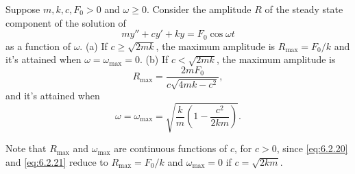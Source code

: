 \begin{theorem}
  \color{blue}
  \label{thmtype:6.2.1} Suppose $m,k,c,F_{0}>0$ and $\omega\ge0$. Consider the amplitude $R$ of the steady state component of the
  solution of
  \[
    my''+cy'+ky=F_{0}\cos\omega t
  \]
  as a function of $\omega$.
  \newline
  \indent
  {\rm(a)} If $c\ge\sqrt{2mk}$, the maximum amplitude is $R_{\max}=F_{0}/k$ and it's attained when
  $\omega= \omega_{\max}=0$.
  \newline
  \indent
  {\rm(b)} If $c<\sqrt{2mk}$, the maximum amplitude is
  \begin{equation}
    \label{eq:6.2.20}R_{\max}=\frac{2mF_{0}}{c\sqrt{4mk-c^{2}}},
  \end{equation}
  and it's attained when
  \begin{equation}
    \label{eq:6.2.21}\omega=\omega_{\max}=\sqrt{\frac{k}{m}\left(1-\frac{c^{2}}{2km}\right)}.
  \end{equation}
\end{theorem}
Note that $R_{\max}$ and $\omega_{\max}$ are continuous functions of $c$, for $c>0$, since
\eqref{eq:6.2.20} and \eqref{eq:6.2.21} reduce to $R_{\max}=F_{0}/k$ and $\omega_{\max}=0$ if
$c=\sqrt{2km}$.

